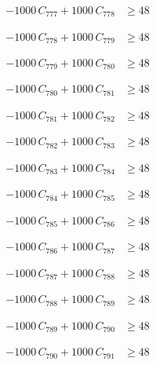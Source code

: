 \documentclass[a4paper,11pt]{article}
\begin{document}
\begin{align}
-1000\,C_{777} + 1000\,C_{778} &\geq 48 \nonumber
\end{align}

\begin{align}
-1000\,C_{778} + 1000\,C_{779} &\geq 48 \nonumber
\end{align}

\begin{align}
-1000\,C_{779} + 1000\,C_{780} &\geq 48 \nonumber
\end{align}

\begin{align}
-1000\,C_{780} + 1000\,C_{781} &\geq 48 \nonumber
\end{align}

\begin{align}
-1000\,C_{781} + 1000\,C_{782} &\geq 48 \nonumber
\end{align}

\begin{align}
-1000\,C_{782} + 1000\,C_{783} &\geq 48 \nonumber
\end{align}

\begin{align}
-1000\,C_{783} + 1000\,C_{784} &\geq 48 \nonumber
\end{align}

\begin{align}
-1000\,C_{784} + 1000\,C_{785} &\geq 48 \nonumber
\end{align}

\begin{align}
-1000\,C_{785} + 1000\,C_{786} &\geq 48 \nonumber
\end{align}

\begin{align}
-1000\,C_{786} + 1000\,C_{787} &\geq 48 \nonumber
\end{align}

\begin{align}
-1000\,C_{787} + 1000\,C_{788} &\geq 48 \nonumber
\end{align}

\begin{align}
-1000\,C_{788} + 1000\,C_{789} &\geq 48 \nonumber
\end{align}

\begin{align}
-1000\,C_{789} + 1000\,C_{790} &\geq 48 \nonumber
\end{align}

\begin{align}
-1000\,C_{790} + 1000\,C_{791} &\geq 48 \nonumber
\end{align}
\end{document}
